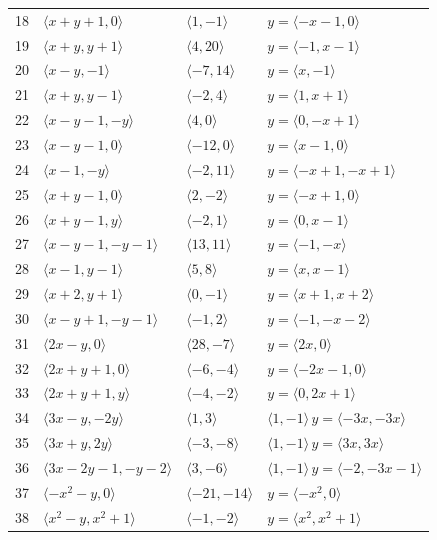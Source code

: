 \documentclass[11pt]{article}
\begin{document}
\begin{longtable}{@{}rlll@{}}
18 & $\langle x+y+1,0\rangle$ & $\langle 1,-1\rangle$ & $y=\langle -x-1,0\rangle$\\
19 & $\langle x+y,y+1\rangle$ & $\langle 4,20\rangle$ & $y=\langle -1,x-1\rangle$\\
20 & $\langle x-y,-1\rangle$ & $\langle -7,14\rangle$ & $y=\langle x,-1\rangle$\\
21 & $\langle x+y,y-1\rangle$ & $\langle -2,4\rangle$ & $y=\langle 1,x+1\rangle$\\
22 & $\langle x-y-1,-y\rangle$ & $\langle 4,0\rangle$ & $y=\langle 0,-x+1\rangle$\\
23 & $\langle x-y-1,0\rangle$ & $\langle -12,0\rangle$ & $y=\langle x-1,0\rangle$\\
24 & $\langle x-1,-y\rangle$ & $\langle -2,11\rangle$ & $y=\langle -x+1,-x+1\rangle$\\
25 & $\langle x+y-1,0\rangle$ & $\langle 2,-2\rangle$ & $y=\langle -x+1,0\rangle$\\
26 & $\langle x+y-1,y\rangle$ & $\langle -2,1\rangle$ & $y=\langle 0,x-1\rangle$\\
27 & $\langle x-y-1,-y-1\rangle$ & $\langle 13,11\rangle$ & $y=\langle -1,-x\rangle$\\
28 & $\langle x-1,y-1\rangle$ & $\langle 5,8\rangle$ & $y=\langle x,x-1\rangle$\\
29 & $\langle x+2,y+1\rangle$ & $\langle 0,-1\rangle$ & $y=\langle x+1,x+2\rangle$\\
30 & $\langle x-y+1,-y-1\rangle$ & $\langle -1,2\rangle$ & $y=\langle -1,-x-2\rangle$\\
31 & $\langle 2x-y,0\rangle$ & $\langle 28,-7\rangle$ & $y=\langle 2x,0\rangle$\\
32 & $\langle 2x+y+1,0\rangle$ & $\langle -6,-4\rangle$ & $y=\langle -2x-1,0\rangle$\\
33 & $\langle 2x+y+1,y\rangle$ & $\langle -4,-2\rangle$ & $y=\langle 0,2x+1\rangle$\\
34 & $\langle 3x-y,-2y\rangle$ & $\langle 1,3\rangle$ & $\langle 1,-1\rangle\,y=\langle -3x,-3x\rangle$\\
35 & $\langle 3x+y,2y\rangle$ & $\langle -3,-8\rangle$ & $\langle 1,-1\rangle\,y=\langle 3x,3x\rangle$\\
36 & $\langle 3x-2y-1,-y-2\rangle$ & $\langle 3,-6\rangle$ & $\langle 1,-1\rangle\,y=\langle -2,-3x-1\rangle$\\
37 & $\langle -x^{2}-y,0\rangle$ & $\langle -21,-14\rangle$ & $y=\langle -x^{2},0\rangle$\\
38 & $\langle x^{2}-y,x^{2}+1\rangle$ & $\langle -1,-2\rangle$ & $y=\langle x^{2},x^{2}+1\rangle$\\

\end{longtable}
\end{document}
